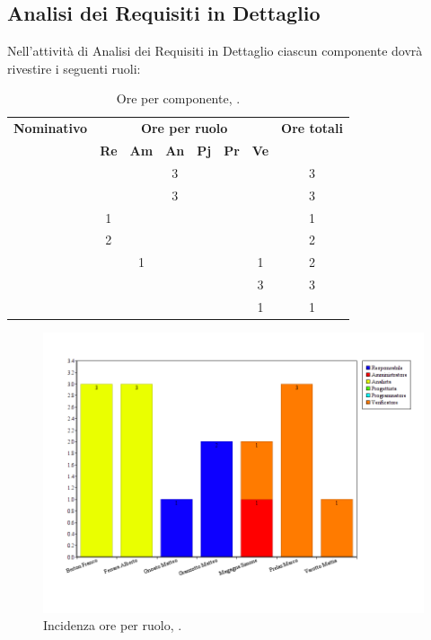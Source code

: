 \subsection{Analisi dei Requisiti in Dettaglio}
Nell'attività di Analisi dei Requisiti in Dettaglio ciascun componente dovrà rivestire i seguenti ruoli:

\begin{table}[H]
	\begin{center}
		\begin{tabular}{|c|c|c|c|c|c|c|c|}
			\hline
			\textbf{Nominativo} & \multicolumn{6}{c|}{\textbf{Ore per ruolo}} & \textbf{Ore totali} \\
			& \textbf{Re} & \textbf{Am} & \textbf{An} & \textbf{Pj} & \textbf{Pr} & \textbf{Ve} & \\
			\hline
			\FB	&		&		&	3	&		&		&		&	3	\\
			\hline
			\AF		&		&		&	3	&	 	&		&		& 	3	\\
			\hline
			\GN		&	1	&		&		&		&		&		&	1	\\
			\hline						
			\GR	&	2	&	 	&	 	&		&	 	& 		&	2	\\
			\hline
			\SM 		&		&	1	&		&		&		& 	1	&	2	\\
			\hline
			\MP		& 		&		&		&		&		&	3	&	3	\\
			\hline						
			\MV 		&		&		&		&		&		&	1	& 	1	\\
			\hline
		\end{tabular}
	\end{center}
	\caption{Ore per componente, \AD.}
\end{table}

\begin{figure}[H]
	\centering
	\includegraphics[scale=0.4]{immagini/Grafi/GrafoARD}
	\caption{Incidenza ore per ruolo, \AD.}
\end{figure}

